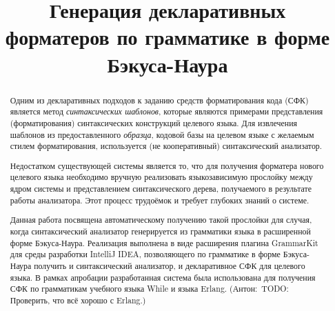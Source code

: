 \documentclass[conference]{IEEEtran}
\newcommand{\app}[1]{{\color{blue}({Антон:\ #1})}\marginpar{!}}
\begin{document}
%
%
\title{Генерация декларативных форматеров по грамматике в форме Бэкуса-Наура}


\author{
\and
{}
}

\maketitle

\begin{abstract}
Одним из декларативных подходов к заданию средств форматирования кода (СФК)
является метод \emph{синтаксических шаблонов}, которые
являются примерами представления (форматирования) синтаксических
конструкций целевого языка.
Для извлечения шаблонов из предоставленного \emph{образца},
кодовой базы на целевом языке с желаемым стилем форматирования,
используется (не кооперативный) синтаксический анализатор. 

Недостатком существующей системы является то, что 
для получения форматера нового целевого языка
необходимо вручную реализовать языкозависимую прослойку между ядром
системы и представлением синтаксического
дерева, получаемого в результате работы анализатора.
Этот процесс трудоёмок и требует глубоких знаний о системе.


Данная работа посвящена автоматическому получению такой прослойки
для случая, когда синтаксический анализатор генерируется из грамматики языка в
расширенной форме Бэкуса-Наура.
Реализация выполнена в виде расширения плагина GrammarKit
для среды разработки IntelliJ IDEA, позволяющего
по грамматике в форме Бэкуса-Наура получить и синтаксический анализатор,
и декларативное СФК для целевого языка.
В рамках апробации разработанная система была использована
для получения СФК по грамматикам учебного языка While
и языка Erlang.
\app{TODO: Проверить, что всё хорошо с Erlang.}
\end{abstract}
\end{document}
